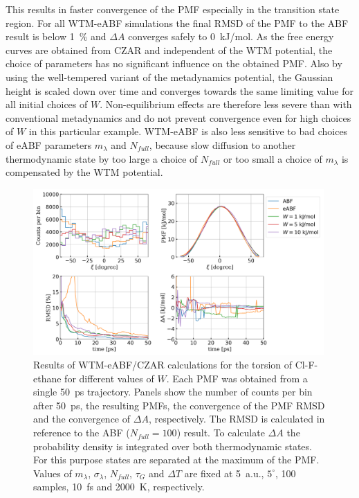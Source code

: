 This results in faster convergence of the PMF especially in the transition state region.
For all WTM-eABF simulations the final RMSD of the PMF to the ABF result is below 1~\% and $\Delta A$ converges safely to 0~kJ/mol.
As the free energy curves are obtained from CZAR and independent of the WTM potential, the choice of parameters has no significant influence on the obtained PMF.
Also by using the well-tempered variant of the metadynamics potential, the Gaussian height is scaled down over time and converges towards the same limiting value for all initial choices of $W$.
Non-equilibrium effects are therefore less severe than with conventional metadynamics and do not prevent convergence even for high choices of $W$ in this particular example.
WTM-eABF is also less sensitive to bad choices of eABF parameters $m_\lambda$ and $N_{full}$, because slow diffusion to another thermodynamic state by too large a choice of $N_{full}$ or too small a choice of $m_\lambda$ is compensated by the WTM potential.
\begin{figure}[H]
  \centering
    \includegraphics[width=0.99\textwidth]{bilder/benchmark/meta_eABF_benchmark}
   \caption{
    Results of WTM-eABF/CZAR calculations for the torsion of Cl-F-ethane for different values of $W$. Each PMF was obtained from a single 50~ps trajectory. Panels show the number of counts per bin after 50~ps, the resulting PMFs, the convergence of the PMF RMSD and the convergence of $\Delta A$, respectively. The RMSD is calculated in reference to the ABF ($N_{full}=100$) result. To calculate $\Delta A$ the probability density is integrated over both thermodynamic states. For this purpose states are separated at the maximum of the PMF.
    Values of $m_{\lambda}$, $\sigma_\lambda$, $N_{full}$, $\tau_G$ and $\Delta T$ are fixed at 5~a.u., $5^\circ$, 100 samples, 10~fs and 2000~K, respectively.
   }
   \label{fig:conf meABF}
\end{figure}
